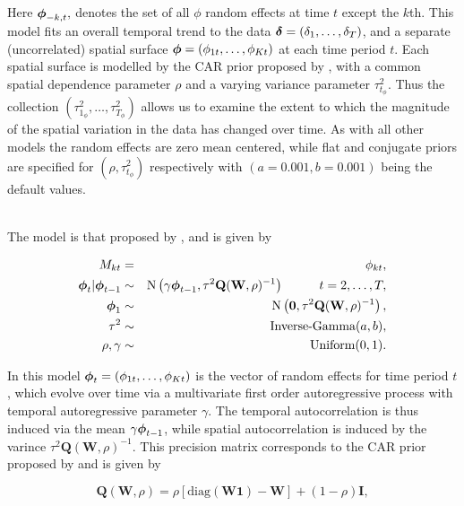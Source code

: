 \documentclass[article,shortnames,nojss]{jss}
\newcommand{\bd}[1]{\ensuremath{\mbox{\boldmath $#1$}}}
\begin{document}
Here $\bd{\phi}_{-k,t},$ denotes the set of all $\phi$ random effects at time $t$ except the $k$th. This model fits an overall temporal trend to the data $\bd{\delta}=(\delta_1,\ldots,\delta_{T})$, and a separate (uncorrelated) spatial surface $\bd{\phi}=(\phi_{1t},\ldots, \phi_{Kt})$ at each time period $t$. Each spatial surface is modelled by the CAR prior proposed by \cite{leroux1999}, with a common spatial dependence parameter $\rho$ and a varying variance parameter $\tau^2_{t_{\phi}}$. Thus the collection $(\tau^2_{1_{\phi}},\ldots, \tau^2_{T_{\phi}})$ allows us to examine the extent to which the magnitude of the spatial variation in the data has changed over time. As with all other models the random effects are zero mean centered, while flat and conjugate priors are specified for $(\rho, \tau^2_{t_{\phi}})$ respectively with $(a=0.001, b=0.001)$ being the default values.\vspace{1cm}




\\
The model is that proposed by \cite{rushworth2014}, and is given by

\begin{eqnarray}
M_{kt}&=&\phi_{kt},\label{carar}\\
\bd{\phi}_t|\bd{\phi}_{t-1} & \sim & \mbox{N}\left(\gamma\bd{\phi}_{t-1}, \tau^{2} \mathbf{Q}(\mathbf{W},\rho)^{-1}\right)\hspace{1cm} t=2,\ldots,T,\nonumber\\
\bd{\phi}_1 & \sim & \mbox{N}\left(\mathbf{0}, \tau^{2} \mathbf{Q}(\mathbf{W},\rho)^{-1}\right),\nonumber\\
\tau^2&\sim&\mbox{Inverse-Gamma}(a,b),\nonumber\\
\rho,\gamma&\sim&\mbox{Uniform}(0,1).\nonumber
\end{eqnarray}

In this model $\bd{\phi}_{t}=(\phi_{1t},\ldots,\phi_{Kt})$ is the vector of random effects for time period $t$, which  evolve over time via a multivariate first order autoregressive process with temporal autoregressive parameter $\gamma$. The temporal autocorrelation is thus induced via the mean $\gamma\bd{\phi}_{t-1}$, while spatial autocorrelation is induced by the varince $\tau^{2} \mathbf{Q}(\mathbf{W},\rho)^{-1}$. This precision matrix corresponds to the CAR prior proposed by \cite{leroux1999} and is given by 

$$\mathbf{Q}(\mathbf{W},\rho)=\rho[\mbox{diag}(\mathbf{W}\mathbf{1}) - \mathbf{W}] + (1-\rho)\mathbf{I},$$
\end{document}
